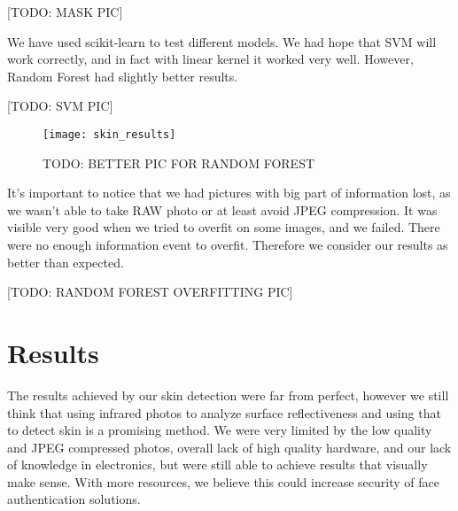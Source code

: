                 [TODO: MASK PIC]

                We have used scikit-learn to test different models.
                We had hope that SVM will work correctly,
                and in fact with linear kernel it worked very well.
                However, Random Forest had slightly better results.

                [TODO: SVM PIC]

                \begin{figure}[H]
                    \caption{TODO: BETTER PIC FOR RANDOM FOREST}
                    \centering
                    \texttt{[image: skin\_results]}
                    \label{fig:skin_results}
                \end{figure}

                It's important to notice that we had pictures
                with big part of information lost,
                as we wasn't able to take RAW photo or at least
                avoid JPEG compression. It was visible very good
                when we tried to overfit on some images, and
                we failed. There were no enough information event to overfit.
                Therefore we consider our results as better than expected.

                [TODO: RANDOM FOREST OVERFITTING PIC]

    \section{Results}
        The results achieved by our skin detection were far from perfect,
        however we still think that using infrared photos to analyze surface
        reflectiveness and using that to detect skin is a promising method.
        We were very limited by the low quality and JPEG compressed photos,
        overall lack of high quality hardware, and our lack of knowledge in electronics,
        but were still able to achieve results that visually make sense.
        With more resources, we believe this could increase security of
        face authentication solutions.

